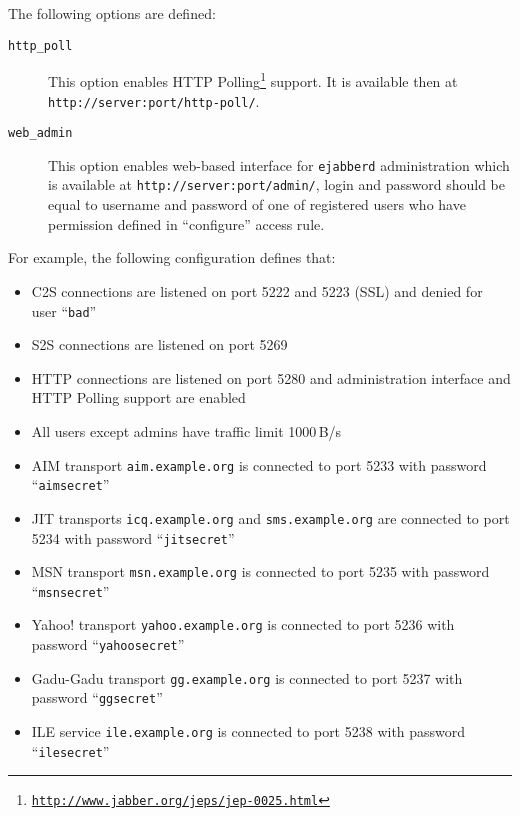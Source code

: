 \documentclass[a4paper,10pt]{article}
\newcommand{\bracehack}{\def\{{\char"7B}\def\}{\char"7D}}
\newcommand{\jid}[1]{\texttt{#1}}
\newcommand{\term}[1]{\texttt{#1}}
\newcommand{\ejabberd}{\texttt{ejabberd}}
\newcommand{\titem}[1]{\item[\bracehack\texttt{#1}]}
\gdef\footahref#1#2{#2\footnote{\href{#1}{\texttt{#1}}}}
\newcommand{\tjepref}[2]{\footahref{http://www.jabber.org/jeps/jep-#1.html}{#2}}
\begin{document}
\begin{description}
  The following options are defined:
  \begin{description}
    \titem{http\_poll} This option enables \tjepref{0025}{HTTP Polling}
    support.  It is available then at \verb|http://server:port/http-poll/|.
    
    \titem{web\_admin} This option enables web-based interface for \ejabberd{}
    administration which is available at \verb|http://server:port/admin/|,
    login and password should be equal to username and password of one of
    registered users who have permission defined in ``configure'' access rule.
  \end{description}
\end{description}

For example, the following configuration defines that:
\begin{itemize}
\item C2S connections are listened on port 5222 and 5223 (SSL) and denied for
  user ``\term{bad}''
\item S2S connections are listened on port 5269
\item HTTP connections are listened on port 5280 and administration interface
  and HTTP Polling support are enabled
\item All users except admins have traffic limit 1000\,B/s
\item AIM transport \jid{aim.example.org} is connected to port 5233 with
  password ``\term{aimsecret}''
\item JIT transports \jid{icq.example.org} and \jid{sms.example.org} are
  connected to port 5234 with password ``\term{jitsecret}''
\item MSN transport \jid{msn.example.org} is connected to port 5235 with
  password ``\term{msnsecret}''
\item Yahoo! transport \jid{yahoo.example.org} is connected to port 5236 with
  password ``\term{yahoosecret}''
\item Gadu-Gadu transport \jid{gg.example.org} is connected to port 5237 with
  password ``\term{ggsecret}''
\item ILE service \jid{ile.example.org} is connected to port 5238 with
  password ``\term{ilesecret}''
\end{itemize}
\end{document}
